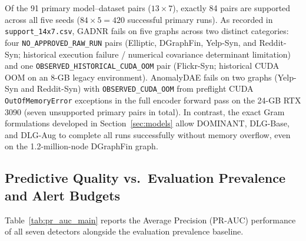 \documentclass[applsci,article,submit,moreauthors,pdftex]{Definitions/mdpi}
\begin{document}
Of the 91 primary model--dataset pairs ($13 \times 7$), exactly 84 pairs are supported across all five seeds ($84 \times 5 = 420$ successful primary runs). As recorded in \texttt{support\_14x7.csv}, GADNR fails on five graphs across two distinct categories: four \texttt{NO\_APPROVED\_RAW\_RUN} pairs (Elliptic, DGraphFin, Yelp-Syn, and Reddit-Syn; historical execution failure / numerical covariance determinant limitation) and one \texttt{OBSERVED\_HISTORICAL\_CUDA\_OOM} pair (Flickr-Syn; historical CUDA OOM on an 8-GB legacy environment). AnomalyDAE fails on two graphs (Yelp-Syn and Reddit-Syn) with \texttt{OBSERVED\_CUDA\_OOM} from preflight CUDA \texttt{OutOfMemoryError} exceptions in the full encoder forward pass on the 24-GB RTX 3090 (seven unsupported primary pairs in total). In contrast, the exact Gram formulations developed in Section~\ref{sec:models} allow DOMINANT, DLG-Base, and DLG-Aug to complete all runs successfully without memory overflow, even on the 1.2-million-node DGraphFin graph.

\subsection{Predictive Quality vs.\ Evaluation Prevalence and Alert Budgets}
Table~\ref{tab:pr_auc_main} reports the Average Precision (PR-AUC) performance of all seven detectors alongside the evaluation prevalence baseline.
\end{document}
